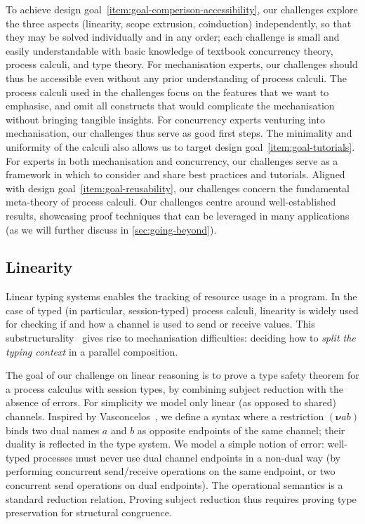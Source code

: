 \documentclass[runningheads]{llncs}
\begin{document}
To achieve design goal~\ref{item:goal-comperison-accessibility}, our challenges explore the three aspects
(linearity, scope extrusion, coinduction) independently, so that they
may be solved individually and in any order; each challenge is small and easily understandable with basic knowledge of
textbook concurrency theory, process calculi, and type theory.
For mechanisation experts, our challenges should thus be accessible even without any prior understanding of process calculi.
The process calculi used in the challenges focus on the features that we want to emphasise, and omit all constructs that would complicate the mechanisation without bringing tangible insights.
For concurrency experts venturing into mechanisation, our challenges thus serve as good first steps.
The minimality and uniformity of the calculi also allows us to target design goal~\ref{item:goal-tutorials}.
For experts in both mechanisation and concurrency, our challenges serve as a framework in which to consider and share best practices and tutorials.
Aligned with design goal~\ref{item:goal-reusability}, our challenges concern the fundamental meta-theory of process calculi.
Our challenges centre around well-established results, showcasing proof techniques that can be leveraged in many applications (as we will further discuss in \cref{sec:going-beyond}).

\subsection{Linearity}
Linear typing systems enables the tracking of resource usage in a program. In
the case of typed (in particular, session-typed) process calculi, linearity is
widely used for checking if and how a channel is used to send or receive values.
This substructurality~\cite[Ch. 1]{Pierce2004-oq} gives rise to mechanisation difficulties: \eg deciding how to \emph{split the
typing context} in a parallel composition.

The goal of our challenge on linear reasoning is to prove a type safety theorem
for a process calculus with session types, by combining subject
reduction with the absence of errors.  For simplicity we model only linear (as
opposed to shared) channels. Inspired by Vasconcelos~\cite{Vasconcelos2012}, we
define a syntax where a restriction $(\bm{\nu} ab)$ binds two dual names $a$
and $b$ as opposite endpoints of the same channel; their duality is
reflected in the type system. We model a simple notion of error: well-typed
processes must never use dual channel endpoints in a non-dual way (\eg by
performing concurrent send/receive operations on the same endpoint, or two
concurrent send operations on dual endpoints).
The operational semantics is a standard reduction relation. Proving subject reduction thus requires proving type preservation for structural congruence.
\end{document}
